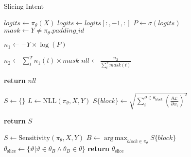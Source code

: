 \begin{algorithm}
\caption{Slicing Intent}
\label{algo:compute_nll}
\begin{algorithmic}[1]

  \State $logits \gets \pi_\theta(X)$ \label{algocn:2}
  \State $logits \gets logits[:,-1,:]$ \label{algocn:3}
  \State $P \gets \sigma(logits)$ \label{algocn:4}
 \State $mask \gets Y\neq \pi_{\theta}.padding\_id$ \label{algocn:1} 

  \State $n_1 \gets -Y \times \log(P) $ \label{algocn:5}
  
  \State $n_2 \gets \sum^{T}_{t}n_1(t) \times mask$ \label{algocn:6}
  \State $nll \gets \frac{n_2}{\sum^{T}_{t}mask(t)}$ \label{algocn:7}

  \State \textbf{return} $nll$ \label{algocn:8}
\EndFunction


  \State $S \gets \{\}$ \label{algocs:2}
    \State $L \gets \text{NLL}(\pi_\theta, X, Y)$\label{algocs:3}
    \label{algocs:4}
        \State $S\{block\} \gets \sqrt{\sum_{i}^{\vartheta \in \theta_{block}} \left(\frac{\partial \mathcal{L}}{\partial w_i}\right)^2}$\label{algocs:5}

    \EndFor
  \State \textbf{return} $S$\label{algocs:6}
\EndFunction

  \State $S \gets \text{Sensitivity}(\pi_\theta, X, Y)$\label{algoid:1}
  \State $B \gets \operatorname*{arg\,max}_{block \in \pi_\theta} S\{block\}$ \label{algoid:2}
\State $\theta_\text{slice} \gets \{\vartheta | \vartheta \in \theta_B \land \theta_B \in \theta\}$ \label{algoid:3}
  \State  \textbf{return} $\theta_\text{slice}$\label{algoid:4}
\EndFunction
\end{algorithmic}
\end{algorithm}
